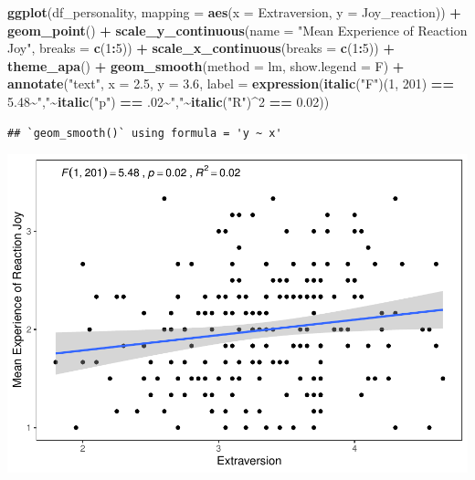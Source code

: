 \documentclass[
]{book}
\newenvironment{Shaded}{\begin{snugshade}}{\end{snugshade}}
\newcommand{\AttributeTok}[1]{\textcolor[rgb]{0.13,0.29,0.53}{#1}}
\newcommand{\DecValTok}[1]{\textcolor[rgb]{0.00,0.00,0.81}{#1}}
\newcommand{\FloatTok}[1]{\textcolor[rgb]{0.00,0.00,0.81}{#1}}
\newcommand{\FunctionTok}[1]{\textcolor[rgb]{0.13,0.29,0.53}{\textbf{#1}}}
\newcommand{\NormalTok}[1]{#1}
\newcommand{\SpecialCharTok}[1]{\textcolor[rgb]{0.81,0.36,0.00}{\textbf{#1}}}
\newcommand{\StringTok}[1]{\textcolor[rgb]{0.31,0.60,0.02}{#1}}
\begin{document}
\begin{Shaded}
\begin{Highlighting}[]
\FunctionTok{ggplot}\NormalTok{(df\_personality, }\AttributeTok{mapping =} \FunctionTok{aes}\NormalTok{(}\AttributeTok{x =}\NormalTok{ Extraversion, }\AttributeTok{y =}\NormalTok{ Joy\_reaction)) }\SpecialCharTok{+}
  \FunctionTok{geom\_point}\NormalTok{() }\SpecialCharTok{+}
  \FunctionTok{scale\_y\_continuous}\NormalTok{(}\AttributeTok{name =} \StringTok{"Mean Experience of Reaction Joy"}\NormalTok{, }\AttributeTok{breaks =} \FunctionTok{c}\NormalTok{(}\DecValTok{1}\SpecialCharTok{:}\DecValTok{5}\NormalTok{)) }\SpecialCharTok{+}
  \FunctionTok{scale\_x\_continuous}\NormalTok{(}\AttributeTok{breaks =} \FunctionTok{c}\NormalTok{(}\DecValTok{1}\SpecialCharTok{:}\DecValTok{5}\NormalTok{)) }\SpecialCharTok{+}
  \FunctionTok{theme\_apa}\NormalTok{() }\SpecialCharTok{+}
  \FunctionTok{geom\_smooth}\NormalTok{(}\AttributeTok{method =}\NormalTok{ lm, }\AttributeTok{show.legend =}\NormalTok{ F) }\SpecialCharTok{+}
  \FunctionTok{annotate}\NormalTok{(}\StringTok{"text"}\NormalTok{, }\AttributeTok{x =} \FloatTok{2.5}\NormalTok{, }\AttributeTok{y =} \FloatTok{3.6}\NormalTok{,}
           \AttributeTok{label =} \FunctionTok{expression}\NormalTok{(}\FunctionTok{italic}\NormalTok{(}\StringTok{"F"}\NormalTok{)(}\DecValTok{1}\NormalTok{, }\DecValTok{201}\NormalTok{) }\SpecialCharTok{==} \FloatTok{5.48}\SpecialCharTok{\textasciitilde{}}\StringTok{","}\SpecialCharTok{\textasciitilde{}}\FunctionTok{italic}\NormalTok{(}\StringTok{"p"}\NormalTok{) }\SpecialCharTok{==}\NormalTok{ .}\DecValTok{02}\SpecialCharTok{\textasciitilde{}}\StringTok{","}\SpecialCharTok{\textasciitilde{}}\FunctionTok{italic}\NormalTok{(}\StringTok{"R"}\NormalTok{)}\SpecialCharTok{\^{}}\DecValTok{2} \SpecialCharTok{==} \FloatTok{0.02}\NormalTok{))}
\end{Highlighting}
\end{Shaded}

\begin{verbatim}
## `geom_smooth()` using formula = 'y ~ x'
\end{verbatim}

\includegraphics{rintro_demo_files/figure-latex/unnamed-chunk-314-1.pdf}
\end{document}
